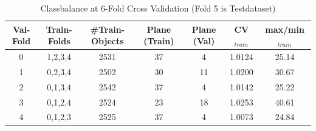 \begin{table}[h!]
\centering

\begin{tabular}{c|c|c|c|c|c|c}
\hline
Val-Fold & Train-Folds & \#Train-Objects & Plane (Train) & Plane (Val) & CV$_{train}$ & max/min$_{train}$ \\
\hline
0 & 1,2,3,4 & 2531 & 37 & 4  & 1.0124 & 25.14 \\
1 & 0,2,3,4 & 2502 & 30 & 11 & 1.0200 & 30.67 \\
2 & 0,1,3,4 & 2542 & 37 & 4  & 1.0142 & 25.22 \\
3 & 0,1,2,4 & 2524 & 23 & 18 & 1.0253 & 40.61 \\
4 & 0,1,2,3 & 2525 & 37 & 4  & 1.0073 & 24.84 \\
\hline
\end{tabular}
\caption[Classbalance at 6-Fold Cross Validation]{Classbalance at 6-Fold Cross Validation (Fold 5 is Testdataset)}
\end{table}



